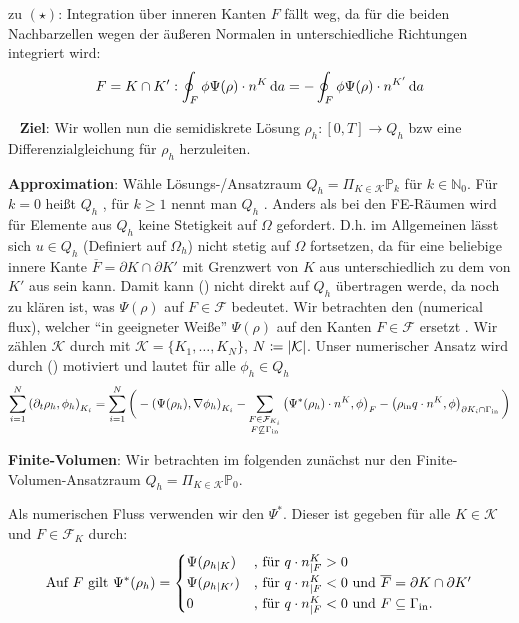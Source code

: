 \begin{remark}
	zu $ (\star) $: Integration über inneren Kanten $ F $ fällt weg, da für die beiden Nachbarzellen wegen der äußeren Normalen in unterschiedliche Richtungen integriert wird:
	\[ F = K \cap K': \oint_{F}  \phi \Psi(\rho) \cdot n^K \mathop{}\!\mathrm{d} a = - \oint_{F} \phi \Psi(\rho) \cdot n^{K'} \mathop{}\!\mathrm{d} a\]
\end{remark}
\ \newline
\textbf{Ziel}:
Wir wollen nun die semidiskrete Lösung $ \rho_h: [0,T] \to Q_h $ bzw eine Differenzialgleichung für $ \rho_h $ herzuleiten. 

\textbf{Approximation}:
Wähle Lösungs-/Ansatzraum $ Q_h = \Pi_{K\in\mathcal{K}} \mathbb{P}_k $ für $ k \in \mathbb{N}_0 $. Für $ k = 0 $ heißt $ Q_h $ , für $ k \geq 1 $ nennt man $ Q_h $ . Anders als bei den FE-Räumen wird für Elemente aus $ Q_h $ keine Stetigkeit auf $ \Omega $ gefordert. D.h. im Allgemeinen lässt sich $ u \in Q_h $ (Definiert auf $ \Omega_h $) nicht stetig auf $ \Omega $ fortsetzen, da für eine beliebige innere Kante $ \overline{F} = \partial K \cap \partial K' $ mit Grenzwert von $ K $ aus unterschiedlich zu dem von $ K' $ aus sein kann. Damit kann (\sun) nicht direkt auf $ Q_h $ übertragen werde, da noch zu klären ist, was $ \Psi(\rho) $ auf $ F \in \mathcal{F} $ bedeutet. Wir betrachten den  (numerical flux), welcher \enquote{in geeigneter Weiße} $ \Psi(\rho) $ auf den Kanten $ F \in \mathcal{F} $ ersetzt . Wir zählen $ \mathcal{K} $ durch mit $ \mathcal{K} = \{K_1 , \dots , K_N\} $, $ N \coloneqq \abs{\mathcal{K}} $.
Unser numerischer Ansatz wird durch (\sun) motiviert und lautet für alle $ \phi_h \in Q_h $
\[
\sum_{i = 1}^{N} \left(\partial_t \rho_h, \phi_h  \right)_{K_i}  = \sum_{i=1}^{N} \bigg(- \left(\Psi(\rho_h), \nabla\phi_h \right)_{K_i} -\sum_{\substack{F \in \mathcal{F}_{K_i} \\ F \not\subseteq \Gamma_{{\text{in}}}}} \left(\Psi^*(\rho_h) \cdot n^K, \phi \right)_{F} - \left(\rho_{\text{in}} q \cdot n^K, \phi \right)_{\partial K_i \cap \Gamma_{{\text{in}}}} \bigg)
\]



\textbf{Finite-Volumen}:
Wir betrachten im folgenden zunächst nur den Finite-Volumen-Ansatzraum $ Q_h = \Pi_{K \in \mathcal{K}} \mathbb{P}_0 $. 

Als numerischen Fluss verwenden wir den  $ \Psi^* $. Dieser ist gegeben für alle $ K \in \mathcal{K} $ und $ F \in \mathcal{F}_K $ durch:
\begin{gather*}
	\text{Auf } F \text{ gilt }\Psi^*(\rho_h) = \begin{cases}
	\Psi(\rho_{h|K}) &\text{, für } q \cdot n^K_{|F} > 0\\
	\Psi(\rho_{h|K'}) &\text{, für } q\cdot n^K_{|F} < 0 \text{ und } \overline{F} = \partial K \cap \partial K'\\
	0 &\text{, für } q\cdot n^K_{|F} < 0 \text{ und } F \subseteq \Gamma_{{\text{in}}}.
	\end{cases}  
\end{gather*}

